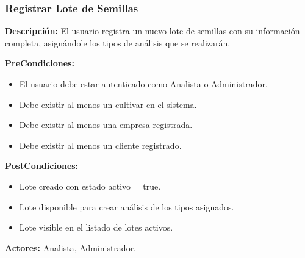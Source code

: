 \subsubsection{Registrar Lote de Semillas}

\textbf{Descripción:} El usuario registra un nuevo lote de semillas con su información completa, asignándole los tipos de análisis que se realizarán.

\vspace{0.5em}
\noindent\textbf{PreCondiciones:}
\begin{itemize}[nosep]
    \item El usuario debe estar autenticado como Analista o Administrador.
    \item Debe existir al menos un cultivar en el sistema.
    \item Debe existir al menos una empresa registrada.
    \item Debe existir al menos un cliente registrado.
\end{itemize}

\vspace{0.5em}
\noindent\textbf{PostCondiciones:}
\begin{itemize}[nosep]
    \item Lote creado con estado activo = true.
    \item Lote disponible para crear análisis de los tipos asignados.
    \item Lote visible en el listado de lotes activos.
\end{itemize}

\vspace{0.5em}
\noindent\textbf{Actores:} Analista, Administrador.


